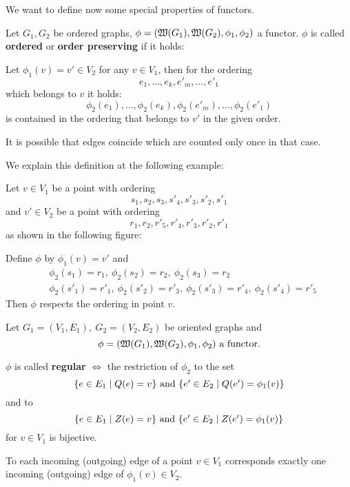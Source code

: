 \bigskip
We want to define now some special properties of functors.

\begin{definition}
Let $G_1, G_2$ be ordered graphs, $\phi = (\mbox{$\mathfrak{W}({G_1})$}, \mbox{$\mathfrak{W}({G_2})$},
\phi_1, \phi_2)$ a functor. $\phi$ is called {\bf ordered} or {\bf order
preserving} if it holds:

Let $\phi_1(v) = v' \in V_2$ for any $v \in V_1$, then for the ordering
\[ e_1, \ldots, e_k, e'_m, \ldots, e'_1 \]
which belongs to $v$ it holds:
\[ \phi_2(e_1), \ldots, \phi_2(e_k), \phi_2(e'_m), \ldots, \phi_2(e'_1) \]
is contained in the ordering that belongs to $v'$ in the given order. 
\end{definition}

It is possible that edges coincide which are counted only once in that case.

We explain this definition at the following example:

Let $v \in V_1$ be a point with ordering 
\[ s_1, s_2, s_3, s'_4, s'_3, s'_2, s'_1 \]
and $v' \in V_2$ be a point with ordering
\[ r_1, r_2, r'_5, r'_4, r'_3, r'_2, r'_1 \]
as shown in the following figure:

\begin{center}

\end{center}

Define $\phi$ by $\phi_1(v) = v'$ and
\begin{eqnarray*}
& \phi_2(s_1) = r_1,\ \phi_2(s_2) = r_2,\ \phi_2(s_3) = r_2 \\
& \phi_2(s'_1) = r'_1,\ \phi_2(s'_2) = r'_3,\ \phi_2(s'_3) = r'_4,\ \phi_2(s'_4)
= r'_5
\end{eqnarray*}
Then $\phi$ respects the ordering in point $v$.

\bigskip
\begin{definition}
Let $G_1=(V_1,E_1),\ G_2=(V_2,E_2)$ be oriented graphs and 
\[ \phi = (\mbox{$\mathfrak{W}({G_1})$}, \mbox{$\mathfrak{W}({G_2})$}, \phi_1, \phi_2)\text{ a functor.}
\]

$\phi$ is called {\bf regular} $\iff$ the restriction of $\phi_2$
to the set \[ \mbox{$\{e \in E_1 \mid Q(e) = v\}$}\text{ and }\mbox{$\{e' \in E_2 \mid
Q(e') = \phi_1(v)\}$} \] and to \[ \mbox{$\{e \in E_1 \mid Z(e) = v\}$}\text{ and
}\mbox{$\{e' \in E_2 \mid Z(e') = \phi_1(v)\}$} \] for $v \in V_1$ is bijective.
\end{definition}

To each incoming (outgoing) edge of a point $v \in V_1$ corresponds exactly
one incoming (outgoing) edge of $\phi_1(v) \in V_2$.

